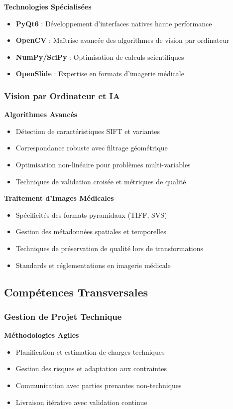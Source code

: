 \documentclass[12pt,a4paper]{report}
\begin{document}
\textbf{Technologies Spécialisées}
\begin{itemize}
\item \textbf{PyQt6} : Développement d'interfaces natives haute performance
\item \textbf{OpenCV} : Maîtrise avancée des algorithmes de vision par ordinateur
\item \textbf{NumPy/SciPy} : Optimisation de calculs scientifiques
\item \textbf{OpenSlide} : Expertise en formats d'imagerie médicale
\end{itemize}

\subsubsection{Vision par Ordinateur et IA}

\textbf{Algorithmes Avancés}
\begin{itemize}
\item Détection de caractéristiques SIFT et variantes
\item Correspondance robuste avec filtrage géométrique
\item Optimisation non-linéaire pour problèmes multi-variables
\item Techniques de validation croisée et métriques de qualité
\end{itemize}

\textbf{Traitement d'Images Médicales}
\begin{itemize}
\item Spécificités des formats pyramidaux (TIFF, SVS)
\item Gestion des métadonnées spatiales et temporelles
\item Techniques de préservation de qualité lors de transformations
\item Standards et réglementations en imagerie médicale
\end{itemize}

\subsection{Compétences Transversales}

\subsubsection{Gestion de Projet Technique}

\textbf{Méthodologies Agiles}
\begin{itemize}
\item Planification et estimation de charges techniques
\item Gestion des risques et adaptation aux contraintes
\item Communication avec parties prenantes non-techniques
\item Livraison itérative avec validation continue
\end{itemize}
\end{document}
